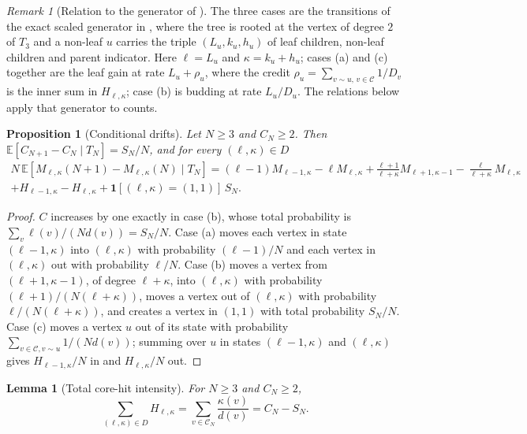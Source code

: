 \documentclass[11pt]{article}
\theoremstyle{plain}
\newtheorem{lemma}[theorem]{Lemma}
\newtheorem{proposition}[theorem]{Proposition}
\theoremstyle{definition}
\theoremstyle{remark}
\newtheorem{remark}[theorem]{Remark}
\begin{document}
\begin{remark}[Relation to the generator of \cite{Uzay2026}]
The three cases are the transitions of the exact scaled generator in \cite[\texttt{proofs/bracket-motifs.md}, Section~2]{Uzay2026}, where the tree is rooted at the vertex of degree $2$ of $T_3$ and a non-leaf $u$ carries the triple $(L_u,k_u,h_u)$ of leaf children, non-leaf children and parent indicator. Here $\ell=L_u$ and $\kappa=k_u+h_u$; cases (a) and (c) together are the leaf gain at rate $L_u+\rho_u$, where the credit $\rho_u=\sum_{v\sim u,\,v\in\mathcal{C}}1/D_v$ is the inner sum in $H_{\ell,\kappa}$; case (b) is budding at rate $L_u/D_u$. The relations below apply that generator to counts.
\end{remark}

\begin{proposition}[Conditional drifts]\label{c:prop:drift}
Let $N\ge3$ and $C_N\ge2$. Then $\mathbb{E}[C_{N+1}-C_N\mid T_N]=S_N/N$, and for every $(\ell,\kappa)\in D$
\begin{multline*}
N\,\mathbb{E}\left[M_{\ell,\kappa}(N+1)-M_{\ell,\kappa}(N)\mid T_N\right]
=(\ell-1)M_{\ell-1,\kappa}-\ell M_{\ell,\kappa}
+\frac{\ell+1}{\ell+\kappa}M_{\ell+1,\kappa-1}-\frac{\ell}{\ell+\kappa}M_{\ell,\kappa}\\
+H_{\ell-1,\kappa}-H_{\ell,\kappa}+\mathbf{1}[(\ell,\kappa)=(1,1)]\,S_N .
\end{multline*}
\end{proposition}

\begin{proof}
$C$ increases by one exactly in case (b), whose total probability is $\sum_v\ell(v)/(Nd(v))=S_N/N$. Case (a) moves each vertex in state $(\ell-1,\kappa)$ into $(\ell,\kappa)$ with probability $(\ell-1)/N$ and each vertex in $(\ell,\kappa)$ out with probability $\ell/N$. Case (b) moves a vertex from $(\ell+1,\kappa-1)$, of degree $\ell+\kappa$, into $(\ell,\kappa)$ with probability $(\ell+1)/(N(\ell+\kappa))$, moves a vertex out of $(\ell,\kappa)$ with probability $\ell/(N(\ell+\kappa))$, and creates a vertex in $(1,1)$ with total probability $S_N/N$. Case (c) moves a vertex $u$ out of its state with probability $\sum_{v\in\mathcal{C},v\sim u}1/(Nd(v))$; summing over $u$ in states $(\ell-1,\kappa)$ and $(\ell,\kappa)$ gives $H_{\ell-1,\kappa}/N$ in and $H_{\ell,\kappa}/N$ out.
\end{proof}

\begin{lemma}[Total core-hit intensity]\label{c:lem:total}
For $N\ge3$ and $C_N\ge2$,
\[
\sum_{(\ell,\kappa)\in D}H_{\ell,\kappa}=\sum_{v\in\mathcal{C}_N}\frac{\kappa(v)}{d(v)}=C_N-S_N .
\]
\end{lemma}
\end{document}
